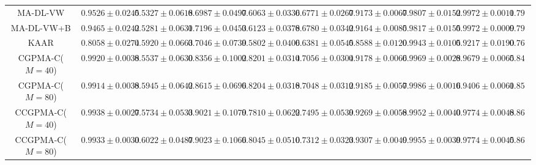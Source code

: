 \documentclass[journal]{IEEEtran}
\begin{document}
\begin{table}[!htb]
{\begin{tabular}{cccccccccc}
        MA-DL-VW        &$0.9526\pm0.0245$ & $0.5327\pm0.0618$ & $0.6987\pm0.0497$ & $0.6063\pm0.0336$ & $0.6771\pm0.0267$ & $0.9173\pm0.0067$ &$0.9807\pm0.0152$& $\mathbf{0.9972\pm0.0011}$& $0.7953$\\ 
        MA-DL-VW+B      &$0.9465\pm0.0242$ & $0.5281\pm0.0631$ & $0.7196\pm0.0453$ & $0.6123\pm0.0378$ & $0.6780\pm0.0342$ & $0.9164\pm0.0085$ &$0.9817\pm0.0155$& $\mathbf{0.9972\pm0.0009}$& $0.7975$\\ 
        KAAR            &$0.8058\pm0.0274$ & $0.5920\pm0.0663$ & $0.7046\pm0.0739$ & $0.5802\pm0.0406$ & $0.6381\pm0.0545$ & $0.8588\pm0.0120$ &$0.9943\pm0.0105$& $0.9217\pm0.0190$& $0.7619$\\ 
        CGPMA-C($M=40$) &$0.9920\pm0.0038$ & $0.5537\pm0.0630$ & $0.8356\pm0.1002$ & $0.8201\pm0.0314$ & $0.7056\pm0.0304$ & $0.9178\pm0.0066$ &$0.9969\pm0.0028$& $0.9679\pm0.0065$& $0.8487$\\ 
        CGPMA-C($M=80$) &$0.9914\pm0.0038$ & $0.5945\pm0.0642$ & $0.8615\pm0.0696$ & $\mathbf{0.8204\pm0.0318}$ & $0.7048\pm0.0312$ & $0.9185\pm0.0057$ &$\mathbf{0.9986\pm0.0016}$& $0.9406\pm0.0061$& $0.8538$\\ 
        CCGPMA-C($M=40$)&$\mathbf{0.9938\pm0.0027}$ & $0.5734\pm0.0533$ & $0.9021\pm0.1079$ & $0.7810\pm0.0622$ & $\mathbf{0.7495\pm0.0539}$ & $0.9269\pm0.0058$ &$0.9952\pm0.0040$& $0.9774\pm0.0048$& $0.8624$\\ 
        CCGPMA-C($M=80$)&$0.9933\pm0.0030$ & $\mathbf{0.6022\pm0.0487}$ & $\mathbf{0.9023\pm0.1066}$ & $0.8045\pm0.0510$ & $0.7312\pm0.0323$ & $\mathbf{0.9307\pm0.0049}$ &$0.9955\pm0.0039$& $0.9774\pm0.0045$& $\mathbf{0.8671}$\\\bottomrule
	\end{tabular}}
	\label{tab:SSClaResults}
\end{table}
\end{document}
